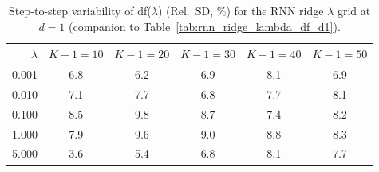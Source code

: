 \begin{table}

\caption{\label{tab:rnn_df_variability_d1}Step-to-step variability of df($\lambda$) (Rel.\ SD, \%) for the RNN ridge $\lambda$ grid at $d=1$ (companion to Table~\ref{tab:rnn_ridge_lambda_df_d1}).}
\footnotesize
\setlength{\tabcolsep}{4pt}
\centering
\begin{tabular}[t]{rccccc}
\toprule
$\lambda$ & $K-1=10$ & $K-1=20$ & $K-1=30$ & $K-1=40$ & $K-1=50$\\
\midrule
0.001 & 6.8 & 6.2 & 6.9 & 8.1 & 6.9\\
0.010 & 7.1 & 7.7 & 6.8 & 7.7 & 8.1\\
0.100 & 8.5 & 9.8 & 8.7 & 7.4 & 8.2\\
1.000 & 7.9 & 9.6 & 9.0 & 8.8 & 8.3\\
5.000 & 3.6 & 5.4 & 6.8 & 8.1 & 7.7\\
\bottomrule
\end{tabular}
\end{table}
